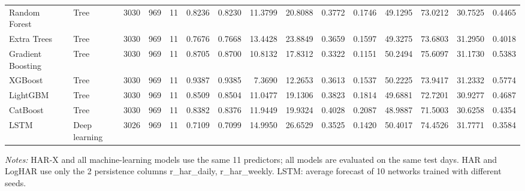 \begin{table}[htbp]
{\begin{tabular}{llrrrrrrrrrrrrr}
Random Forest & Tree & 3030 & 969 & 11 & 0.8236 & 0.8230 & 11.3799 & 20.8088 & 0.3772 & 0.1746 & 49.1295 & 73.0212 & 30.7525 & 0.4465 \\
Extra Trees & Tree & 3030 & 969 & 11 & 0.7676 & 0.7668 & 13.4428 & 23.8849 & 0.3659 & 0.1597 & 49.3275 & 73.6803 & 31.2950 & 0.4018 \\
Gradient Boosting & Tree & 3030 & 969 & 11 & 0.8705 & 0.8700 & 10.8132 & 17.8312 & 0.3322 & 0.1151 & 50.2494 & 75.6097 & 31.1730 & 0.5383 \\
XGBoost & Tree & 3030 & 969 & 11 & 0.9387 & 0.9385 & 7.3690 & 12.2653 & 0.3613 & 0.1537 & 50.2225 & 73.9417 & 31.2332 & 0.5774 \\
LightGBM & Tree & 3030 & 969 & 11 & 0.8509 & 0.8504 & 11.0477 & 19.1306 & 0.3823 & 0.1814 & 49.6881 & 72.7201 & 30.9277 & 0.4687 \\
CatBoost & Tree & 3030 & 969 & 11 & 0.8382 & 0.8376 & 11.9449 & 19.9324 & 0.4028 & 0.2087 & 48.9887 & 71.5003 & 30.6258 & 0.4354 \\
LSTM & Deep learning & 3026 & 969 & 11 & 0.7109 & 0.7099 & 14.9950 & 26.6529 & 0.3525 & 0.1420 & 50.4017 & 74.4526 & 31.7771 & 0.3584 \\
\bottomrule
\end{tabular}%
}
\par\vspace{2pt}\footnotesize\textit{Notes:} HAR-X and all machine-learning models use the same 11 predictors; all models are evaluated on the same test days. HAR and LogHAR use only the 2 persistence columns r\_har\_daily, r\_har\_weekly. LSTM: average forecast of 10 networks trained with different seeds.
\end{table}
